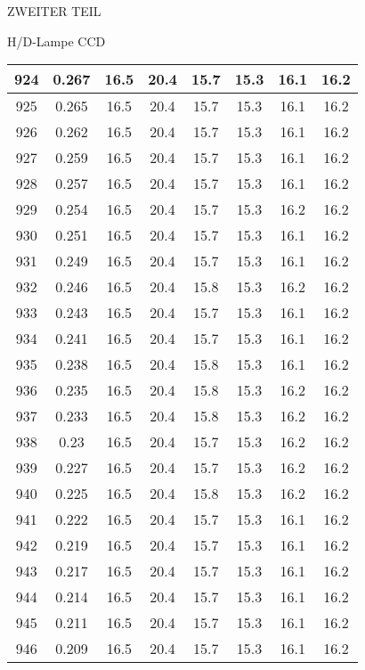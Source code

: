 \begin{appendix}
\begin{chapter}{ZWEITER TEIL}
\begin{section}{H/D-Lampe CCD}
\begin{scriptsize}
\begin{longtable}[htbp]{|c|c|c|c|c|c|c|c|}
            924 & 0.267 & 16.5 & 20.4 & 15.7 & 15.3 & 16.1 & 16.2 \\ \hline
            925 & 0.265 & 16.5 & 20.4 & 15.7 & 15.3 & 16.1 & 16.2 \\ \hline
            926 & 0.262 & 16.5 & 20.4 & 15.7 & 15.3 & 16.1 & 16.2 \\ \hline
            927 & 0.259 & 16.5 & 20.4 & 15.7 & 15.3 & 16.1 & 16.2 \\ \hline
            928 & 0.257 & 16.5 & 20.4 & 15.7 & 15.3 & 16.1 & 16.2 \\ \hline
            929 & 0.254 & 16.5 & 20.4 & 15.7 & 15.3 & 16.2 & 16.2 \\ \hline
            930 & 0.251 & 16.5 & 20.4 & 15.7 & 15.3 & 16.1 & 16.2 \\ \hline
            931 & 0.249 & 16.5 & 20.4 & 15.7 & 15.3 & 16.1 & 16.2 \\ \hline
            932 & 0.246 & 16.5 & 20.4 & 15.8 & 15.3 & 16.2 & 16.2 \\ \hline
            933 & 0.243 & 16.5 & 20.4 & 15.7 & 15.3 & 16.1 & 16.2 \\ \hline
            934 & 0.241 & 16.5 & 20.4 & 15.7 & 15.3 & 16.1 & 16.2 \\ \hline
            935 & 0.238 & 16.5 & 20.4 & 15.8 & 15.3 & 16.1 & 16.2 \\ \hline
            936 & 0.235 & 16.5 & 20.4 & 15.8 & 15.3 & 16.2 & 16.2 \\ \hline
            937 & 0.233 & 16.5 & 20.4 & 15.8 & 15.3 & 16.2 & 16.2 \\ \hline
            938 & 0.23 & 16.5 & 20.4 & 15.7 & 15.3 & 16.2 & 16.2 \\ \hline
            939 & 0.227 & 16.5 & 20.4 & 15.7 & 15.3 & 16.2 & 16.2 \\ \hline
            940 & 0.225 & 16.5 & 20.4 & 15.8 & 15.3 & 16.2 & 16.2 \\ \hline
            941 & 0.222 & 16.5 & 20.4 & 15.7 & 15.3 & 16.1 & 16.2 \\ \hline
            942 & 0.219 & 16.5 & 20.4 & 15.7 & 15.3 & 16.1 & 16.2 \\ \hline
            943 & 0.217 & 16.5 & 20.4 & 15.7 & 15.3 & 16.1 & 16.2 \\ \hline
            944 & 0.214 & 16.5 & 20.4 & 15.7 & 15.3 & 16.1 & 16.2 \\ \hline
            945 & 0.211 & 16.5 & 20.4 & 15.7 & 15.3 & 16.1 & 16.2 \\ \hline
            946 & 0.209 & 16.5 & 20.4 & 15.7 & 15.3 & 16.1 & 16.2 \\ \hline

\end{longtable}
\end{scriptsize}
\end{section}
\end{chapter}
\end{appendix}
